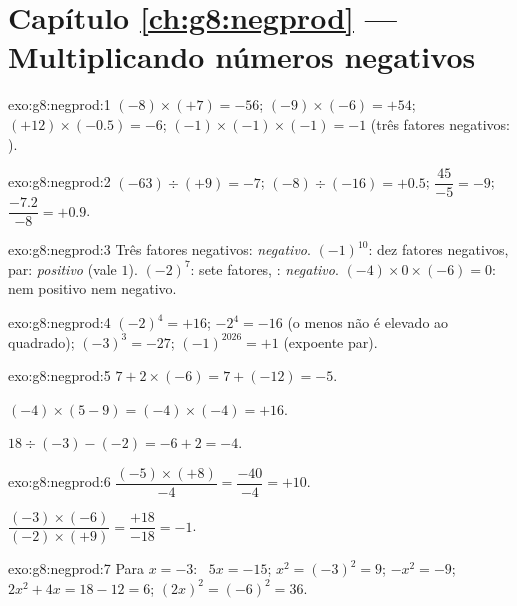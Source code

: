 \section*{Capítulo \ref{ch:g8:negprod} --- Multiplicando números negativos}

\begin{solution}{exo:g8:negprod:1}
$(-8) \times (+7) = -56$; \quad
$(-9) \times (-6) = +54$; \quad
$(+12) \times (-0.5) = -6$; \quad
$(-1) \times (-1) \times (-1) = -1$ (três fatores negativos: ).
\end{solution}

\begin{solution}{exo:g8:negprod:2}
$(-63) \div (+9) = -7$; \quad
$(-8) \div (-16) = +0.5$; \quad
$\dfrac{45}{-5} = -9$; \quad
$\dfrac{-7.2}{-8} = +0.9$.
\end{solution}

\begin{solution}{exo:g8:negprod:3}
Três fatores negativos: \emph{negativo}. \quad
$(-1)^{10}$: dez fatores negativos, par: \emph{positivo} (vale $1$).
\quad
$(-2)^7$: sete fatores, : \emph{negativo}. \quad
$(-4) \times 0 \times (-6) = 0$: nem positivo nem negativo.
\end{solution}

\begin{solution}{exo:g8:negprod:4}
$(-2)^4 = +16$; \quad $-2^4 = -16$ (o menos não é elevado ao
quadrado); \quad $(-3)^3 = -27$; \quad $(-1)^{2026} = +1$ (expoente
par).
\end{solution}

\begin{solution}{exo:g8:negprod:5}
$7 + 2 \times (-6) = 7 + (-12) = -5$.

$(-4) \times (5 - 9) = (-4) \times (-4) = +16$.

$18 \div (-3) - (-2) = -6 + 2 = -4$.
\end{solution}

\begin{solution}{exo:g8:negprod:6}
$\dfrac{(-5) \times (+8)}{-4} = \dfrac{-40}{-4} = +10$.

$\dfrac{(-3) \times (-6)}{(-2) \times (+9)} = \dfrac{+18}{-18} = -1$.
\end{solution}

\begin{solution}{exo:g8:negprod:7}
Para $x = -3$: \ $5x = -15$; \quad $x^2 = (-3)^2 = 9$; \quad
$-x^2 = -9$; \quad $2x^2 + 4x = 18 - 12 = 6$; \quad
$(2x)^2 = (-6)^2 = 36$.
\end{solution}

